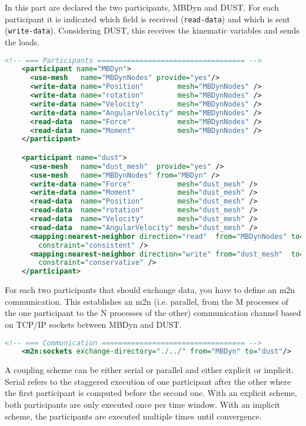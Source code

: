 In this part are declared the two participants, MBDyn and DUST. For each participant it is indicated which field is received (\texttt{read-data}) and which is sent (\texttt{write-data}). Considering DUST, this receives the kinematic variables and sends the loads. 
\begin{lstlisting}[language=XML]
    <!-- === Participants =================================== -->
    <participant name="MBDyn">
      <use-mesh   name="MBDynNodes" provide="yes"/>
      <write-data name="Position"        mesh="MBDynNodes" />
      <write-data name="rotation"        mesh="MBDynNodes" />
      <write-data name="Velocity"        mesh="MBDynNodes" />
      <write-data name="AngularVelocity" mesh="MBDynNodes" />
      <read-data  name="Force"           mesh="MBDynNodes" />
      <read-data  name="Moment"          mesh="MBDynNodes" />
    </participant>

    <participant name="dust">
      <use-mesh   name="dust_mesh"  provide="yes" />
      <use-mesh   name="MBDynNodes" from="MBDyn" />
      <write-data name="Force"           mesh="dust_mesh" />
      <write-data name="Moment"          mesh="dust_mesh" />
      <read-data  name="Position"        mesh="dust_mesh" />
      <read-data  name="rotation"        mesh="dust_mesh" />
      <read-data  name="Velocity"        mesh="dust_mesh" />
      <read-data  name="AngularVelocity" mesh="dust_mesh" />
      <mapping:nearest-neighbor direction="read"  from="MBDynNodes" to="dust_mesh"
        constraint="consistent" />
      <mapping:nearest-neighbor direction="write" from="dust_mesh"  to="MBDynNodes"
        constraint="conservative" />
    </participant>
\end{lstlisting}

For each two participants that should exchange data, you have to define an m2n communication. 
This establishes an m2n (i.e. parallel, from the M processes of the one participant to the N processes of the other) communication channel based on TCP/IP sockets between MBDyn and DUST.
\begin{lstlisting}[language=XML]
    <!-- === Communication ================================== -->
    <m2n:sockets exchange-directory="./../" from="MBDyn" to="dust"/>
\end{lstlisting}

A coupling scheme can be either serial or parallel and either explicit or implicit. Serial refers to the staggered execution of one participant after the other where the first participant is computed before the second one. With an explicit scheme, both participants are only executed once per time window. With an implicit scheme, the participants are executed multiple times until convergence.

